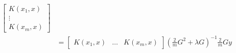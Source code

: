 \documentclass{amsart}
\theoremstyle{definition}
\begin{document}
\begin{enumerate}[(a)]
\begin{align*}
\begin{bmatrix}
                                                  K(x_1, x)\\
                                                  \vdots \\
                                                  K(x_m, x)
                                                 \end{bmatrix}\\
                                                 &=\begin{bmatrix}
                                                  K(x_1, x) & \ldots & K(x_m, x)
                                                 \end{bmatrix} \left(\frac2{m} G^2 + \lambda G\right)^{-1} \frac2{m} G y
      \end{align*}
\end{enumerate}
\end{document}
